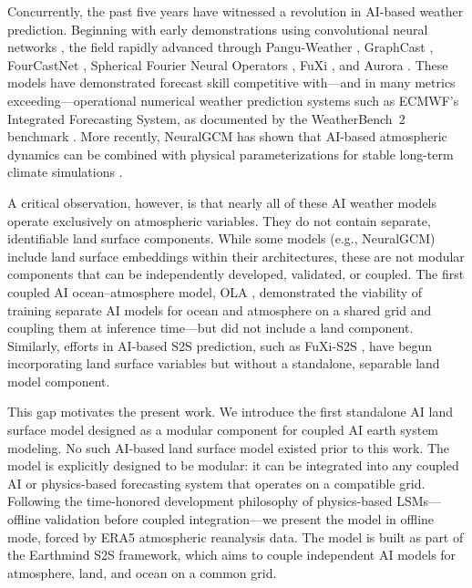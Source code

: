\documentclass[11pt]{article}
\begin{document}
Concurrently, the past five years have witnessed a revolution in AI-based weather prediction. Beginning with early demonstrations using convolutional neural networks \citep{weyn2019dlwp, weyn2020dlwpcs}, the field rapidly advanced through Pangu-Weather \citep{bi2023pangu}, GraphCast \citep{lam2023graphcast}, FourCastNet \citep{pathak2022fourcastnet}, Spherical Fourier Neural Operators \citep{bonev2023sfno}, FuXi \citep{chen2023fuxi}, and Aurora \citep{bodnar2024aurora}. These models have demonstrated forecast skill competitive with---and in many metrics exceeding---operational numerical weather prediction systems such as ECMWF's Integrated Forecasting System, as documented by the WeatherBench~2 benchmark \citep{rasp2024weatherbench2}. More recently, NeuralGCM has shown that AI-based atmospheric dynamics can be combined with physical parameterizations for stable long-term climate simulations \citep{kochkov2024neuralGCM}.

A critical observation, however, is that nearly all of these AI weather models operate exclusively on atmospheric variables. They do not contain separate, identifiable land surface components. While some models (e.g., NeuralGCM) include land surface embeddings within their architectures, these are not modular components that can be independently developed, validated, or coupled. The first coupled AI ocean--atmosphere model, OLA \citep{caillon2024ola}, demonstrated the viability of training separate AI models for ocean and atmosphere on a shared grid and coupling them at inference time---but did not include a land component. Similarly, efforts in AI-based S2S prediction, such as FuXi-S2S \citep{chen2024fuxis2s}, have begun incorporating land surface variables but without a standalone, separable land model component.

This gap motivates the present work. We introduce the first standalone AI land surface model designed as a modular component for coupled AI earth system modeling. No such AI-based land surface model existed prior to this work. The model is explicitly designed to be modular: it can be integrated into any coupled AI or physics-based forecasting system that operates on a compatible grid. Following the time-honored development philosophy of physics-based LSMs---offline validation before coupled integration---we present the model in offline mode, forced by ERA5 atmospheric reanalysis data. The model is built as part of the Earthmind S2S framework, which aims to couple independent AI models for atmosphere, land, and ocean on a common grid.
\end{document}
